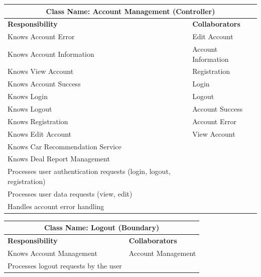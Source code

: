 \documentclass[]{article}
\begin{document}
\begin{table}[H]
  \centering
  \renewcommand{\arraystretch}{1.3} %
  \begin{tabular}{|p{7.5cm}|p{7.5cm}|}
    \hline
    \multicolumn{2}{|c|}{\textbf{Class Name: Account Management (Controller)}}                    \\
    \hline
    \textbf{Responsibility}                                              & \textbf{Collaborators} \\
    \hline
    Knows Account Error                                                  & Edit Account           \\
    Knows Account Information                                            & Account Information    \\
    Knows View Account                                                   & Registration           \\
    Knows Account Success                                                & Login                  \\
    Knows Login                                                          & Logout                 \\
    Knows Logout                                                         & Account Success        \\
    Knows Registration                                                   & Account Error          \\
    Knows Edit Account                                                   & View Account           \\
    Knows Car Recommendation Service                                     &                        \\
    Knows Deal Report Management                                         &                        \\
    Processes user authentication requests (login, logout, registration) &                        \\
    Processes user data requests (view, edit)                            &                        \\
    Handles account error handling                                       &                        \\
    \hline
  \end{tabular}
\end{table}
\begin{table}[H]
  \centering
  \renewcommand{\arraystretch}{1.3} %
  \begin{tabular}{|p{7.5cm}|p{7.5cm}|}
    \hline
    \multicolumn{2}{|c|}{\textbf{Class Name: Logout (Boundary)}}   \\
    \hline
    \textbf{Responsibility}               & \textbf{Collaborators} \\
    \hline
    Knows Account Management              & Account Management     \\
    Processes logout requests by the user &                        \\
    \hline
  \end{tabular}
\end{table}
\end{document}
